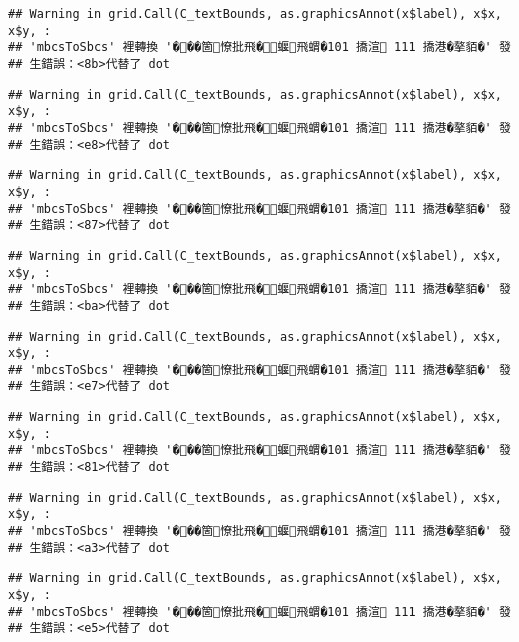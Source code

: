 \documentclass[
]{article}
\begin{document}
\begin{verbatim}
## Warning in grid.Call(C_textBounds, as.graphicsAnnot(x$label), x$x, x$y, :
## 'mbcsToSbcs' 裡轉換 '���箇憭批飛�蝘飛蝟�101 撟渲 111 撟港�摮貊�' 發
## 生錯誤：<8b>代替了 dot
\end{verbatim}

\begin{verbatim}
## Warning in grid.Call(C_textBounds, as.graphicsAnnot(x$label), x$x, x$y, :
## 'mbcsToSbcs' 裡轉換 '���箇憭批飛�蝘飛蝟�101 撟渲 111 撟港�摮貊�' 發
## 生錯誤：<e8>代替了 dot
\end{verbatim}

\begin{verbatim}
## Warning in grid.Call(C_textBounds, as.graphicsAnnot(x$label), x$x, x$y, :
## 'mbcsToSbcs' 裡轉換 '���箇憭批飛�蝘飛蝟�101 撟渲 111 撟港�摮貊�' 發
## 生錯誤：<87>代替了 dot
\end{verbatim}

\begin{verbatim}
## Warning in grid.Call(C_textBounds, as.graphicsAnnot(x$label), x$x, x$y, :
## 'mbcsToSbcs' 裡轉換 '���箇憭批飛�蝘飛蝟�101 撟渲 111 撟港�摮貊�' 發
## 生錯誤：<ba>代替了 dot
\end{verbatim}

\begin{verbatim}
## Warning in grid.Call(C_textBounds, as.graphicsAnnot(x$label), x$x, x$y, :
## 'mbcsToSbcs' 裡轉換 '���箇憭批飛�蝘飛蝟�101 撟渲 111 撟港�摮貊�' 發
## 生錯誤：<e7>代替了 dot
\end{verbatim}

\begin{verbatim}
## Warning in grid.Call(C_textBounds, as.graphicsAnnot(x$label), x$x, x$y, :
## 'mbcsToSbcs' 裡轉換 '���箇憭批飛�蝘飛蝟�101 撟渲 111 撟港�摮貊�' 發
## 生錯誤：<81>代替了 dot
\end{verbatim}

\begin{verbatim}
## Warning in grid.Call(C_textBounds, as.graphicsAnnot(x$label), x$x, x$y, :
## 'mbcsToSbcs' 裡轉換 '���箇憭批飛�蝘飛蝟�101 撟渲 111 撟港�摮貊�' 發
## 生錯誤：<a3>代替了 dot
\end{verbatim}

\begin{verbatim}
## Warning in grid.Call(C_textBounds, as.graphicsAnnot(x$label), x$x, x$y, :
## 'mbcsToSbcs' 裡轉換 '���箇憭批飛�蝘飛蝟�101 撟渲 111 撟港�摮貊�' 發
## 生錯誤：<e5>代替了 dot
\end{verbatim}
\end{document}

